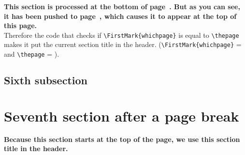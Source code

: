 \documentclass{article}
\newcounter{thispage}
\begin{document}
{\bfseries This section is processed at the bottom of page~\thethispage. But as you can see, it has been pushed to page~\pageref{sec:push}, which causes it to appear at the top of this page.}\\
Therefore the code that checks if \verb|\FirstMark{whichpage}| is equal to \verb|\thepage| makes it put the current section title in the header.
(\verb|\FirstMark{whichpage}| = \thethispage{} and  \verb|\thepage| = \pageref{sec:push}).

\medskip

\lipsum[1-6]

\subsection{Sixth subsection}

\lipsum[7]

\newpage
\section{Seventh section after a page break}
\label{sec:newpage}

{\bfseries Because this section starts at the top of the page, we use this section title in the header.}

\medskip

\lipsum[8-10]
\end{document}
